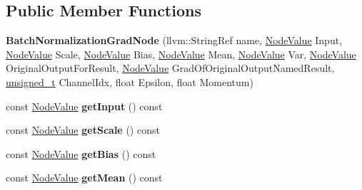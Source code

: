 \subsection*{Public Member Functions}
\begin{DoxyCompactItemize}
\item 
\mbox{\label{classglow_1_1_batch_normalization_grad_node_a4ceb603f4f666fabaf58215c22ea7767}} 
{\bfseries Batch\+Normalization\+Grad\+Node} (llvm\+::\+String\+Ref name, \hyperlink{structglow_1_1_node_value}{Node\+Value} Input, \hyperlink{structglow_1_1_node_value}{Node\+Value} Scale, \hyperlink{structglow_1_1_node_value}{Node\+Value} Bias, \hyperlink{structglow_1_1_node_value}{Node\+Value} Mean, \hyperlink{structglow_1_1_node_value}{Node\+Value} Var, \hyperlink{structglow_1_1_node_value}{Node\+Value} Original\+Output\+For\+Result, \hyperlink{structglow_1_1_node_value}{Node\+Value} Grad\+Of\+Original\+Output\+Named\+Result, \hyperlink{namespaceglow_a0ca574644e1e42ef193a9947fb4d8911}{unsigned\+\_\+t} Channel\+Idx, float Epsilon, float Momentum)
\item 
\mbox{\label{classglow_1_1_batch_normalization_grad_node_a8ab7cde856355c8eeb32c21f6e83ad52}} 
const \hyperlink{structglow_1_1_node_value}{Node\+Value} {\bfseries get\+Input} () const
\item 
\mbox{\label{classglow_1_1_batch_normalization_grad_node_acdccb329b2d39eab62f109ba7806649c}} 
const \hyperlink{structglow_1_1_node_value}{Node\+Value} {\bfseries get\+Scale} () const
\item 
\mbox{\label{classglow_1_1_batch_normalization_grad_node_afd1961b17de580a1f8c15cc8e6bc7034}} 
const \hyperlink{structglow_1_1_node_value}{Node\+Value} {\bfseries get\+Bias} () const
\item 
\mbox{\label{classglow_1_1_batch_normalization_grad_node_a858b0df63d0e54ae207fb8d3a2b6a99f}} 
const \hyperlink{structglow_1_1_node_value}{Node\+Value} {\bfseries get\+Mean} () const
\item 
\mbox{\label{classglow_1_1_batch_normalization_grad_node_a4e543599b6bd0442477283c82683e780}} 

\end{DoxyCompactItemize}
